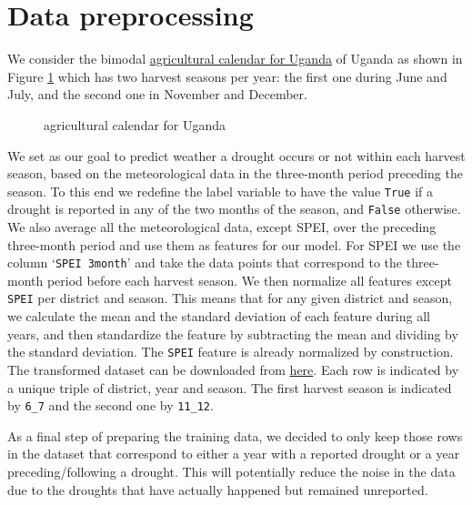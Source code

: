 \documentclass[10pt,parskip=half,
toc=sectionentrywithdots,
bibliography=totocnumbered,
captions=tableheading,numbers=noendperiod]{scrartcl}
\begin{document}
\hypertarget{data-preprocessing}{%
\section{Data preprocessing}\label{data-preprocessing}}

We consider the bimodal
\href{https://fews.net/east-africa/uganda}{agricultural calendar for
Uganda} of Uganda as shown in Figure \ref{fig:calendar} which has two
harvest seasons per year: the first one during June and July, and the
second one in November and December.

\begin{figure}[]
\hypertarget{fig:calendar}{%
\begin{center}
\end{center}
\caption{agricultural calendar for Uganda}\label{fig:calendar}
}
\end{figure}

We set as our goal to predict weather a drought occurs or not within
each harvest season, based on the meteorological data in the three-month
period preceding the season. To this end we redefine the label variable
to have the value \texttt{True} if a drought is reported in any of the
two months of the season, and \texttt{False} otherwise. We also average
all the meteorological data, except SPEI, over the preceding three-month
period and use them as features for our model. For SPEI we use the
column `\texttt{SPEI\ 3month}' and take the data points that correspond
to the three-month period before each harvest season. We then normalize
all features except \texttt{SPEI} per district and season. This means
that for any given district and season, we calculate the mean and the
standard deviation of each feature during all years, and then
standardize the feature by subtracting the mean and dividing by the
standard deviation. The \texttt{SPEI} feature is already normalized by
construction.\\
The transformed dataset can be downloaded from
\href{https://github.com/rodekruis/Drought_IBF/blob/master/Model\%20Event\%20Data/datasets/Uganda_seasonal_normalized.csv}{here}.
Each row is indicated by a unique triple of district, year and season.
The first harvest season is indicated by \texttt{6\_7} and the second
one by \texttt{11\_12}.

As a final step of preparing the training data, we decided to only keep
those rows in the dataset that correspond to either a year with a
reported drought or a year preceding/following a drought. This will
potentially reduce the noise in the data due to the droughts that have
actually happened but remained unreported.
\end{document}
